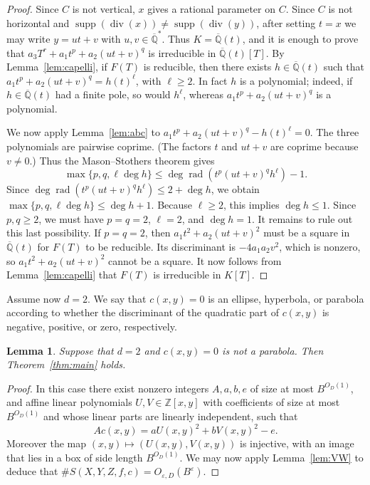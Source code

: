 \documentclass[a4paper,11pt,twoside,reqno]{amsart}
\newtheorem{lemma}[theorem]{Lemma}
\theoremstyle{definition}
\theoremstyle{remark}
\numberwithin{equation}{section}
\newcommand\ve{\varepsilon}
\newcommand\ZZ{\mathbb{Z}}
\newcommand\supp{\operatorname{supp}}
\newcommand\K{\overline{\mathbb{Q}}}
\newcommand\1{\mathbf{1}}
\DeclareMathOperator\rad{rad}
\renewcommand{\leq}{\leqslant}
\renewcommand{\geq}{\geqslant}
\begin{document}
\begin{proof}
	Since $C$ is not vertical, $x$ gives a rational parameter on $C$. Since $C$ is not horizontal and $\supp(\operatorname{div}(x))\neq \supp(\operatorname{div}(y))$, after setting $t=x$ we may write $y=ut+v$ with $u,v\in\K^*$. Thus $K=\K(t)$, and it is enough to prove that $a_3T^r+a_1t^p+a_2(ut+v)^q$ is irreducible in $\K(t)[T]$. By Lemma~\ref{lem:capelli}, if $F(T)$ is reducible, then there exists $h\in\K(t)$ such that $a_1t^p+a_2(ut+v)^q= h(t)^\ell$, with $\ell\geq2$. In fact $h$ is a polynomial; indeed, 
	if $h\in \K(t)$ had a finite pole, so would $h^\ell$, whereas $a_1t^p+a_2(ut+v)^q$ is a polynomial.
	
	We now apply Lemma~\ref{lem:abc} to $a_1t^p+a_2(ut+v)^q- h(t)^\ell=0$. The three polynomials are pairwise coprime. (The factors $t$ and $ut+v$ are coprime because $v\neq0$.)
	Thus the Mason--Stothers theorem gives 
	\[\max\{p,q,\ell\deg h\}\leq \deg\rad(t^p(ut+v)^qh^\ell)-1.
	\] 
	Since $\deg\rad(t^p(ut+v)^qh^\ell)\leq 2+\deg h$, we obtain $\max\{p,q,\ell\deg h\}\leq \deg h+1$. Because $\ell\geq2$, this implies $\deg h\leq1$. Since $p,q\geq2$, we must have $p=q=2$, $\ell=2$, and $\deg h=1$.
	It remains to rule out this last possibility. If $p=q=2$, then $a_1t^2+a_2(ut+v)^2$ must be a square in $\K(t)$ for $F(T)$ to be reducible. Its discriminant is $-4a_1a_2v^2$, which is nonzero, so $a_1t^2+a_2(ut+v)^2$ cannot be a square. It now follows from Lemma~\ref{lem:capelli} that $F(T)$ is irreducible in $K[T]$.
\end{proof}

Assume now $d=2$. We say that $c(x,y)=0$ is an ellipse, hyperbola, or parabola according to whether the discriminant of the quadratic part of $c(x,y)$ is negative, positive, or zero, respectively. 

\begin{lemma}\label{lem:nopar}
Suppose that $d=2$ and $c(x,y)=0$ is not a parabola. Then Theorem~\ref{thm:main} holds.
\end{lemma}
\begin{proof}
In this case there exist nonzero integers $A,a,b,e$ of size at most $B^{O_D(1)}$, and 
affine linear polynomials $U,V\in \ZZ[x,y]$ 
with coefficients of size at most $B^{O_D(1)}$
and whose linear parts are linearly independent,
such that 
 \[
A c(x,y)=aU(x,y)^2+bV(x,y)^2-e.
 \]
Moreover the map 
$(x,y)\mapsto (U(x,y),V(x,y))$ is injective, with an image that lies in a box of side length 
$B^{O_D(1)}$.
 We may now apply Lemma~\ref{lem:VW} to deduce that 
 $\#S(X,Y,Z,f,c)=O_{\ve,D}(B^\ve)$.
 \end{proof}
\end{document}
